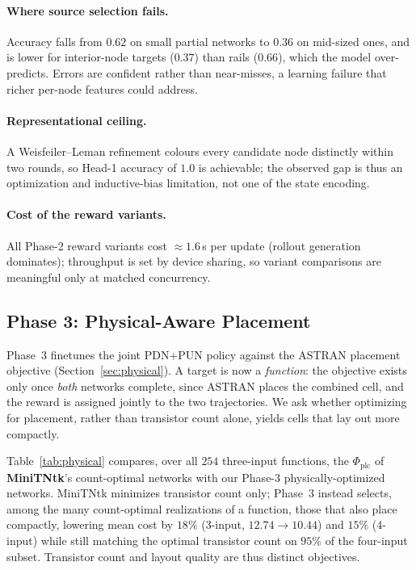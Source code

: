 \paragraph{Where source selection fails.}
Accuracy falls from $0.62$ on small partial networks to $0.36$ on mid-sized
ones, and is lower for interior-node targets ($0.37$) than rails ($0.66$),
which the model over-predicts.  Errors are confident rather than near-misses,
a learning failure that richer per-node features could address.

\paragraph{Representational ceiling.}
A Weisfeiler--Leman refinement colours every candidate node distinctly within
two rounds, so Head-1 accuracy of $1.0$ is achievable; the observed gap is thus
an optimization and inductive-bias limitation, not one of the state encoding.

\paragraph{Cost of the reward variants.}
All Phase-2 reward variants cost $\approx 1.6$\,s per update (rollout generation
dominates); throughput is set by device sharing, so variant comparisons are
meaningful only at matched concurrency.

\subsection{Phase 3: Physical-Aware Placement}
\label{sec:physical_exp}

Phase~3 finetunes the joint PDN+PUN policy against the ASTRAN placement
objective (Section~\ref{sec:physical}).  A target is now a \emph{function}:
the objective exists only once \emph{both} networks complete, since ASTRAN
places the combined cell, and the reward is assigned jointly to the two
trajectories.  We ask whether optimizing for placement, rather than
transistor count alone, yields cells that lay out more compactly.

Table~\ref{tab:physical} compares, over all $254$ three-input functions, the
$\Phi_{\mathrm{plc}}$ of \textbf{MiniTNtk}'s count-optimal networks with our
Phase-3 physically-optimized networks.  MiniTNtk minimizes transistor count
only; Phase~3 instead selects, among the many count-optimal realizations of a
function, those that also place compactly, lowering mean cost by $18\%$
($3$-input, $12.74\!\to\!10.44$) and $15\%$ ($4$-input) while still matching
the optimal transistor count on $95\%$ of the four-input subset.  Transistor
count and layout quality are thus distinct objectives.

